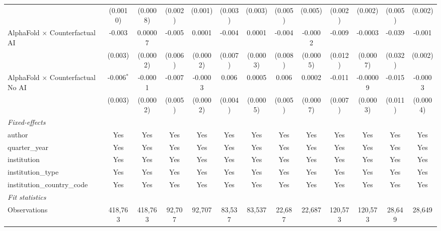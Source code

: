 \begin{tabular}{lcccccccccccc}
                                            & (0.0010)      & (0.0008)       & (0.002) & (0.001)       & (0.003) & (0.003)  & (0.005) & (0.005)  & (0.002) & (0.002)       & (0.005) & (0.002)\\   
   AlphaFold $\times$ Counterfactual AI     & -0.003        & 0.00007        & -0.005  & 0.0001        & -0.004  & 0.0001   & -0.004  & -0.0002  & -0.009  & -0.0003       & -0.039  & -0.001\\   
                                            & (0.003)       & (0.0002)       & (0.006) & (0.0002)      & (0.007) & (0.0003) & (0.008) & (0.0005) & (0.012) & (0.0007)      & (0.032) & (0.002)\\   
   AlphaFold $\times$ Counterfactual No AI  & -0.006$^{*}$  & -0.0001        & -0.007  & -0.0003       & 0.006   & 0.0005   & 0.006   & 0.0002   & -0.011  & -0.00009      & -0.015  & -0.0003\\   
                                            & (0.003)       & (0.0002)       & (0.005) & (0.0002)      & (0.004) & (0.0005) & (0.005) & (0.0007) & (0.007) & (0.0003)      & (0.011) & (0.0004)\\   
   \midrule
   \emph{Fixed-effects}\\
   author                                   & Yes           & Yes            & Yes     & Yes           & Yes     & Yes      & Yes     & Yes      & Yes     & Yes           & Yes     & Yes\\  
   quarter\_year                            & Yes           & Yes            & Yes     & Yes           & Yes     & Yes      & Yes     & Yes      & Yes     & Yes           & Yes     & Yes\\  
   institution                              & Yes           & Yes            & Yes     & Yes           & Yes     & Yes      & Yes     & Yes      & Yes     & Yes           & Yes     & Yes\\  
   institution\_type                        & Yes           & Yes            & Yes     & Yes           & Yes     & Yes      & Yes     & Yes      & Yes     & Yes           & Yes     & Yes\\  
   institution\_country\_code               & Yes           & Yes            & Yes     & Yes           & Yes     & Yes      & Yes     & Yes      & Yes     & Yes           & Yes     & Yes\\  
   \midrule
   \emph{Fit statistics}\\
   Observations                             & 418,763       & 418,763        & 92,707  & 92,707        & 83,537  & 83,537   & 22,687  & 22,687   & 120,573 & 120,573       & 28,649  & 28,649\\  

\end{tabular}
